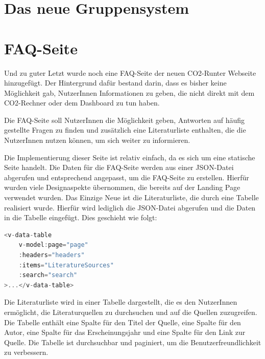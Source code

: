 \section{Das neue Gruppensystem}


\section{FAQ-Seite}

Und zu guter Letzt wurde noch eine FAQ-Seite der neuen CO2-Runter Webseite hinzugefügt. Der Hintergrund dafür bestand darin, dass es bisher keine Möglichkeit gab, NutzerInnen Informationen zu geben, die nicht direkt mit dem CO2-Rechner oder dem Dashboard zu tun haben.

Die FAQ-Seite soll NutzerInnen die Möglichkeit geben, Antworten auf häufig gestellte Fragen zu finden und zusätzlich eine Literaturliste enthalten, die die NutzerInnen nutzen können, um sich weiter zu informieren.


Die Implementierung dieser Seite ist relativ einfach, da es sich um eine statische Seite handelt. Die Daten für die FAQ-Seite werden aus einer \acs{JSON}-Datei abgerufen und entsprechend angepasst, um die FAQ-Seite zu erstellen. Hierfür wurden viele Designaspekte übernommen, die bereits auf der Landing Page verwendet wurden. Das Einzige Neue ist die Literaturliste, die durch eine Tabelle realisiert wurde. Hierfür wird lediglich die \acs{JSON}-Datei abgerufen und die Daten in die Tabelle eingefügt. Dies geschieht wie folgt:

\begin{lstlisting}[language={JavaScript}, caption={Laden der Literaturliste}]
<v-data-table
    v-model:page="page"
    :headers="headers"
    :items="LiteratureSources"
    :search="search"
>...</v-data-table>
\end{lstlisting}

Die Literaturliste wird in einer Tabelle dargestellt, die es den NutzerInnen ermöglicht, die Literaturquellen zu durchsuchen und auf die Quellen zuzugreifen. Die Tabelle enthält eine Spalte für den Titel der Quelle, eine Spalte für den Autor, eine Spalte für das Erscheinungsjahr und eine Spalte für den Link zur Quelle. Die Tabelle ist durchsuchbar und paginiert, um die Benutzerfreundlichkeit zu verbessern.

